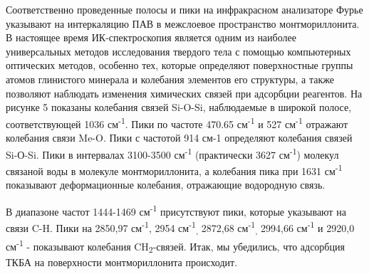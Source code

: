 %
%

Соответственно проведенные полосы и пики на инфракрасном анализаторе
Фурье указывают на интеркаляцию ПАВ в межслоевое пространство
монтмориллонита. В настоящее время ИК-спектроскопия является одним из
наиболее универсальных методов исследования твердого тела с помощью
компьютерных оптических методов, особенно тех, которые определяют
поверхностные группы атомов глинистого минерала и колебания элементов
его структуры, а также позволяют наблюдать изменения химических связей
при адсорбции реагентов. На рисунке 5 показаны колебания связей Si-O-Si,
наблюдаемые в широкой полосе, соответствующей 1036
см\textsuperscript{-1}. Пики по частоте 470.65 см\textsuperscript{-1} и
527 см\textsuperscript{-1} отражают колебания связи Me-O. Пики с
частотой 914 см-1 определяют колебания связей Si-О-Si. Пики в интервалах
3100-3500 см\textsuperscript{-1} (практически 3627
см\textsuperscript{-1}) молекул связаной воды в молекуле
монтмориллонита, а колебания пика при 1631 см\textsuperscript{-1}
показывают деформационные колебания, отражающие водородную связь.

В диапазоне частот 1444-1469 см\textsuperscript{-1} присутствуют пики,
которые указывают на связи C-H. Пики на 2850,97 см\textsuperscript{-1},
2954 см\textsuperscript{-1}\textsubscript{,} 2872,68
см\textsuperscript{-1}\textsubscript{,} 2994,66 см\textsuperscript{-1} и
2920,0 см\textsuperscript{-1} - показывают колебания
CH\textsubscript{2}-связей. Итак, мы убедились, что адсорбция ТКБА на
поверхности монтмориллонита происходит.

